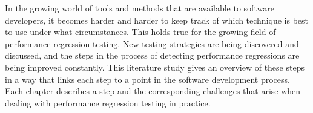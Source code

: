 In the growing world of tools and methods that are available to software developers, it becomes harder and harder to keep track of which technique is best to use under what circumstances. This holds true for the growing field of performance regression testing. New testing strategies are being discovered and discussed, and the steps in the process of detecting performance regressions are being improved constantly. This literature study gives an overview of these steps in a way that links each step to a point in the software development process. Each chapter describes a step and the corresponding challenges that arise when dealing with performance regression testing in practice.
